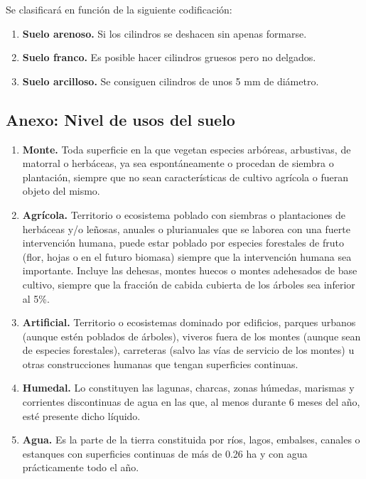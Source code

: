 \label{sec:textura}

Se clasificará en función de la siguiente codificación:

\begin{enumerate}
    \item \textbf{Suelo arenoso.} Si los cilindros se deshacen sin apenas formarse.
    \item \textbf{Suelo franco.} Es posible hacer cilindros gruesos pero no delgados.
    \item \textbf{Suelo arcilloso.} Se consiguen cilindros de unos 5 mm de diámetro.
\end{enumerate}

\subsection{Anexo: Nivel de usos del suelo}\label{sec:nivel1}

\begin{enumerate}
    \item \textbf{Monte.} Toda superficie en la que vegetan especies arbóreas, arbustivas, de matorral o herbáceas, ya sea espontáneamente o procedan de siembra o plantación, siempre que no sean características de cultivo agrícola o fueran objeto del mismo.
    \item \textbf{Agrícola.} Territorio o ecosistema poblado con siembras o plantaciones de herbáceas y/o leñosas, anuales o plurianuales que se laborea con una fuerte intervención humana, puede estar poblado por especies forestales de fruto (flor, hojas o en el futuro biomasa) siempre que la intervención humana sea importante. Incluye las dehesas, montes huecos o montes adehesados de base cultivo, siempre que la fracción de cabida cubierta de los árboles sea inferior al 5\%.
    \item \textbf{Artificial.} Territorio o ecosistemas dominado por edificios, parques urbanos (aunque estén poblados de árboles), viveros fuera de los montes (aunque sean de especies forestales), carreteras (salvo las vías de servicio de los montes) u otras construcciones humanas que tengan superficies continuas.
    \item \textbf{Humedal.} Lo constituyen las lagunas, charcas, zonas húmedas, marismas y corrientes discontinuas de agua en las que, al menos durante 6 meses del año, esté presente dicho líquido.
    \item \textbf{Agua.} Es la parte de la tierra constituida por ríos, lagos, embalses, canales o estanques con superficies continuas de más de 0.26 ha y con agua prácticamente todo el año.
\end{enumerate}


